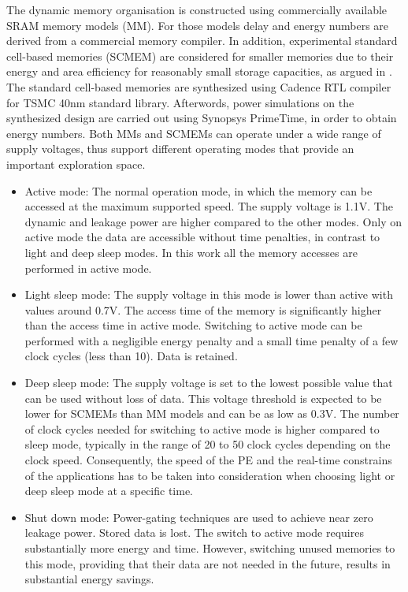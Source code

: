 \documentclass[prodmode,acmtodaes]{acmsmall}
\begin{document}
The dynamic memory organisation is constructed using commercially available SRAM memory models (MM).
For those models delay and energy numbers are derived from a commercial memory compiler.
In addition, experimental standard cell-based memories (SCMEM) \cite{Mei11}  are  considered for smaller memories due to their energy and area efficiency for reasonably small storage capacities, as argued in \cite{Mei10}. 
The standard cell-based memories are synthesized using Cadence RTL compiler for TSMC 40nm standard library. 
Afterwords, power simulations on the synthesized design are carried out using Synopsys PrimeTime, in order to obtain energy numbers.
Both MMs and SCMEMs can operate under a wide range of supply voltages, thus support different operating modes that provide an important exploration space.
\begin{itemize}
\item Active mode: The normal operation mode, in which the memory can be accessed at the maximum supported speed. The supply voltage is 1.1V. 
The dynamic and leakage power are higher compared to the other modes.
Only on active mode the data are accessible without time penalties, in contrast to light and deep sleep modes.
In this work all the memory accesses are performed in active mode. 
\item Light sleep mode: The supply voltage in this mode is lower than active with values around 0.7V. 
The access time of the memory is significantly higher than the access time in active mode. 
Switching to active mode can be performed with a negligible energy penalty and a small time penalty of a few clock cycles (less than 10). 
Data is retained.  
\item Deep sleep mode: The supply voltage is set to the lowest possible value that can be used without loss of data. 
This voltage threshold is expected to be lower for SCMEMs than MM models and can be as low as 0.3V. 
The number of clock cycles needed for switching to active mode is higher compared to sleep mode, typically in the range of 20 to 50 clock cycles depending on the clock speed. 
Consequently, the speed of the PE and the real-time constrains of the applications has to be taken into consideration when choosing light or deep sleep mode at a specific time.  
\item Shut down mode: Power-gating techniques are used to achieve near zero leakage power. 
Stored data is lost. 
The switch to active mode requires substantially more energy and time. 
However, switching unused memories to this mode, providing that their data are not needed in the future, results in substantial energy savings.
\end{itemize}  
\end{document}
